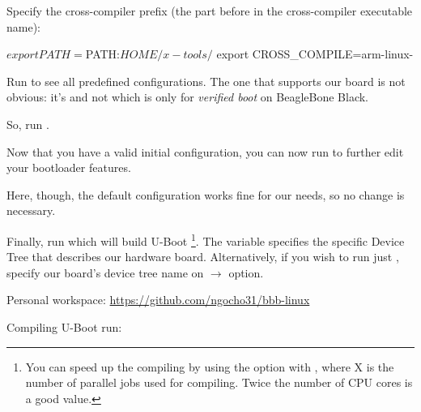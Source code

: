 \begin{enumerate}
\item Specify the cross-compiler prefix
(the part before  in the cross-compiler executable name):

\begin{bashinput}
$ export PATH=$PATH:$HOME/x-tools/%
$ export CROSS_COMPILE=arm-linux-
\end{bashinput}

{
\item Run  to see all predefined
      configurations. The one that supports our board is not obvious:
      it's  and not
       which is only for {\em
      verified boot} on BeagleBone Black.
\item So, run .
}{}

\item Now that you have a valid initial configuration, you can now
  run  to further edit your bootloader features.

Here, though, the default configuration works fine for our needs,
so no change is necessary.

\item Finally, run
  which will build U-Boot
  \footnote{You can speed up the
  compiling by using the  option with , where X
  is the number of parallel jobs used for compiling. Twice the
  number of CPU cores is a good value.}.
  The  variable specifies the specific
  Device Tree that describes our hardware board.
  Alternatively, if you wish to run just ,
  specify our board's device tree name on
   $\rightarrow$ 
  option.
\end{enumerate}

\begin{notebox}
Personal workspace: \url{https://github.com/ngocho31/bbb-linux}

Compiling U-Boot run: 
\end{notebox}
